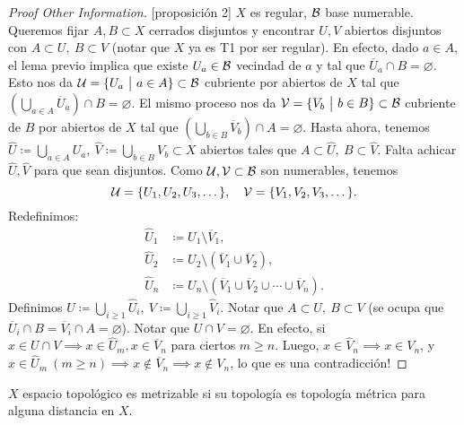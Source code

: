 \begin{proof}[Proof Other Information][proposición 2]
	$X$ es regular, $\mathcal{B}$ base numerable. Queremos fijar $A, B \subset X$ cerrados disjuntos y encontrar $U, V$ abiertos disjuntos con $A \subset U,\ B \subset V$ (notar que $X$ ya es T1 por ser regular). En efecto, dado $a \in A$, el lema previo implica que existe $U_{a} \in \mathcal{B}$ vecindad de $a$ y tal que $\overline{U}_{a} \cap B = \varnothing$. Esto nos da $\mathcal{U} = \{U_{a} \ \big| \ a \in A\} \subset \mathcal{B}$ cubriente por abiertos de $X$ tal que $(\bigcup_{a \in A} \overline{U}_{a}) \cap B = \varnothing$. El mismo proceso nos da $\mcal{V} = \{V_{b} \ \big| \ b \in B\} \subset \mcal{B}$ cubriente de $B$ por abiertos de $X$ tal que $(\bigcup_{b \in B} \overline{V}_{b}) \cap A = \varnothing$. Hasta ahora, tenemos $\widehat{U} \coloneq \bigcup_{a \in A} U_{a},\ \widehat{V} \coloneq \bigcup_{b \in B} V_{b} \subset X$ abiertos tales que $A \subset \widehat{U},\ B \subset \widehat{V}$. Falta achicar $\widehat{U}, \widehat{V}$ para que sean disjuntos. Como $\mathcal{U}, \mathcal{V} \subset \mathcal{B}$ son numerables, tenemos
	\[ \mathcal{U} = \{U_{1},U_{2},U_{3},\dots\}, \quad \mathcal{V} = \{V_{1},V_{2},V_{3},\dots\}. \]
	Redefinimos: 
	\begin{align*}
		\widehat{U}_{1} &\coloneq U_{1} \setminus \overline{V}_{1}, \\
		\widehat{U}_{2} &\coloneq U_{2} \setminus (\overline{V}_{1} \cup \overline{V}_{2}), \\
		\widehat{U}_{n} &\coloneq U_{n} \setminus (\overline{V}_{1} \cup \overline{V}_{2} \cup \cdots \cup \overline{V}_{n})
	.\end{align*}
	Definimos $U \coloneq \bigcup_{i \geq 1} \widehat{U}_{i},\ V \coloneq \bigcup_{i \geq 1} \widehat{V}_{i}$. Notar que $A \subset U,\ B \subset V$ (se ocupa que $\overline{U}_{i} \cap B = \overline{V}_{i} \cap A = \varnothing$). Notar que $U \cap V = \varnothing$. En efecto, si $x \in U \cap V \implies x \in \widehat{U}_{m}, x \in \overline{V}_{n}$ para ciertos $m \geq n$. Luego, $x \in \widehat{V}_{n} \implies x \in V_{n}$, y $x \in \widehat{U}_{m} \ (m \geq n) \implies x \not\in \overline{V}_{n} \implies x \not\in V_{n}$, lo que es una contradicción!
\end{proof}

\begin{definition}
	$X$ espacio topológico es metrizable si su topología es topología métrica para alguna distancia en $X$.
\end{definition}

